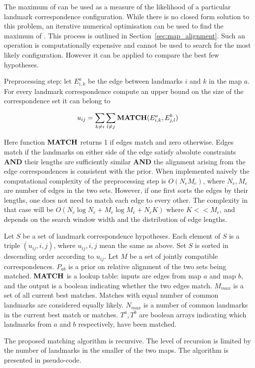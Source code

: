 The maximum of  can be used as a measure of
the likelihood of a particular landmark correspondence configuration.
While there is no closed form solution to this problem, an iterative
numerical optimisation can be used to find the maximum of
. This process is outlined in
Section~\ref{sec:map_alignment}. Such an operation is computationally
expensive and cannot be used to search for the most likely
configuration. However it can be applied to compare the best few
hypotheses.



Preprocessing step: let $E^a_{i,k}$ be the edge between landmarks $i$
and $k$ in the map $a$. For every landmark correspondence compute an
upper bound on the size of the correspondence set it can belong to

$$
u_{ij} = \sum_{k \ne i} \sum_{l \ne j} {\bf MATCH}(E^a_{i,k}, E^b_{j,l})
$$

Here function ${\bf MATCH}$ returns 1 if edges match and zero
otherwise. Edges match if the landmarks on either side of the edge
satisfy absolute constraints {\bf AND} their lengths are sufficiently
similar {\bf AND} the alignment arising from the edge correspondences
is consistent with the prior. When implemented naively the
computational complexity of the preprocessing step is $O(N_eM_e)$,
where $N_e,M_e$ are number of edges in the two sets. However, if one
first sorts the edges by their lengths, one does not need to match
each edge to every other. The complexity in that case will be
$O(N_e\log N_e + M_e\log M_e + N_eK)$ where $K << M_e$, and depends on
the search window width and the distribution of edge lengths.

Let $S$ be a set of landmark correspondence hypotheses. Each element
of $S$ is a triple $(u_{ij}, i, j)$, where $u_{ij},i,j$ mean the same
as above. Set $S$ is sorted in descending order according to
$u_{ij}$. Let $M$ be a set of jointly compatible
correspondences. $P_{ab}$ is a prior on relative alignment of the two
sets being matched. ${\bf MATCH}$ is a lookup table: inputs are edges
from map $a$ and map $b$, and the output is a boolean indicating
whether the two edges match. $M_{max}$ is a set of all current best
matches. Matches with equal number of common landmarks are considered
equally likely. $N_{max}$ is a number of common landmarks in the
current best match or matches. $T^a,T^b$ are boolean arrays indicating
which landmarks from $a$ and $b$ respectively, have been matched.

The proposed matching algorithm is recursive. The level of recursion
is limited by the number of landmarks in the smaller of the two
maps. The algorithm is presented in pseudo-code.

